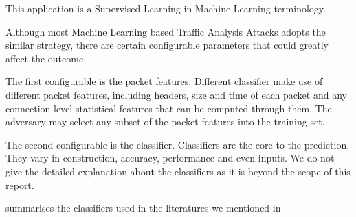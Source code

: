 This application is a Supervised Learning in Machine Learning terminology.

Although most Machine Learning based Traffic Analysis Attacks adopts the similar strategy, there are certain configurable parameters that could greatly affect the outcome.

The first configurable is the packet features. Different classifier make use of different packet features, including headers, size and time of each packet and any connection level statistical features that can be computed through them. The adversary may select any subset of the packet features into the training set.

The second configurable is the classifier. Classifiers are the core to the prediction. They vary in construction,  accuracy, performance and even inputs. We do not give the detailed explanation about the classifiers as it is beyond the scope of this report. 

 summarises the classifiers used in the literatures we mentioned in 

